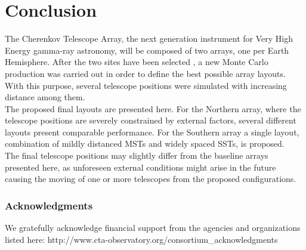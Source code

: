 \documentclass{PoS}
\begin{document}
\section{Conclusion}
The Cherenkov Telescope Array, the next generation instrument for Very High Energy gamma-ray astronomy, will be composed of two arrays, one per Earth Hemisphere. After the two sites have been selected \cite{Hassan2017Apj}, a new Monte Carlo production was carried out in order to define the best possible array layouts. With this purpose, several telescope positions were simulated with increasing distance among them.\\
The proposed final layouts are presented here. For the Northern array, where the telescope positions are severely constrained by external factors, several different layouts present comparable performance. For the Southern array a single layout, combination of mildly distanced MSTs and widely spaced SSTs, is proposed.\\
The final telescope positions may slightly differ from the baseline arrays presented here, as unforeseen external conditions might arise in the future causing the moving of one or more telescopes from the proposed configurations.

\subsubsection*{Acknowledgments}
We gratefully acknowledge financial support from the agencies and organizations listed here: http://www.cta-observatory.org/consortium\_acknowledgments



\end{document}
